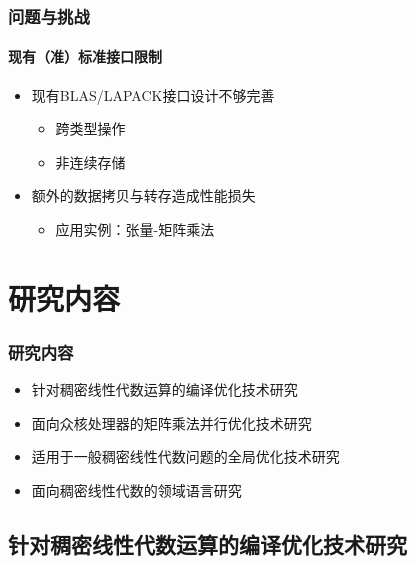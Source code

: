 \documentclass[aspectratio=169]{beamer}
\begin{document}
\begin{frame}
  \frametitle{问题与挑战}
  \framesubtitle{现有（准）标准接口限制}
  \begin{itemize}
  \item 现有BLAS/LAPACK接口设计不够完善
    \begin{itemize}
    \item 跨类型操作
    \item 非连续存储
    \end{itemize}
  \item 额外的数据拷贝与转存造成性能损失
    \begin{itemize}
    \item 应用实例：张量-矩阵乘法
    \end{itemize}
  \end{itemize}
\end{frame}

\section{研究内容}

\begin{frame}
  \frametitle{研究内容}
  \begin{itemize}
  \item 针对稠密线性代数运算的编译优化技术研究
  \item 面向众核处理器的矩阵乘法并行优化技术研究
  \item 适用于一般稠密线性代数问题的全局优化技术研究
  \item 面向稠密线性代数的领域语言研究
  \end{itemize}
\end{frame}

\subsection[编译优化技术研究]{针对稠密线性代数运算的编译优化技术研究}
\end{document}
